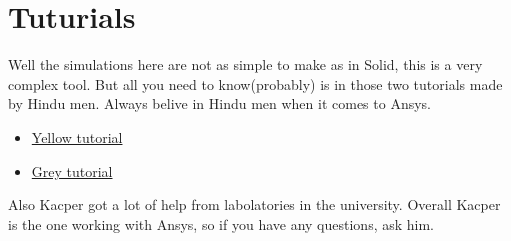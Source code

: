 \section{Tuturials}
Well the simulations here are not as simple to make as in Solid, this is a very complex tool. 
But all you need to know(probably) is in those two tutorials made by Hindu men. Always belive
in Hindu men when it comes to Ansys.

\begin{itemize}
    \item \href{https://www.youtube.com/watch?v=yiCuIDY_LZ4}{Yellow tutorial}
    \item \href{https://www.youtube.com/watch?v=uFYkQ4gt2Tc&t=274s}{Grey tutorial}
\end{itemize}
Also Kacper got a lot of help from labolatories in the university. Overall Kacper is 
the one working with Ansys, so if you have any questions, ask him.